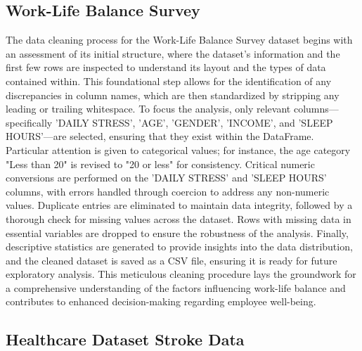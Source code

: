 \documentclass[runningheads]{llncs}
\begin{document}
\begin{enumerate}
\subsection{Work-Life Balance Survey}

The data cleaning process for the Work-Life Balance Survey dataset begins with an assessment of its initial structure, where the dataset's information and the first few rows are inspected to understand its layout and the types of data contained within. This foundational step allows for the identification of any discrepancies in column names, which are then standardized by stripping any leading or trailing whitespace. To focus the analysis, only relevant columns—specifically 'DAILY STRESS', 'AGE', 'GENDER', 'INCOME', and 'SLEEP HOURS'—are selected, ensuring that they exist within the DataFrame. Particular attention is given to categorical values; for instance, the age category "Less than 20" is revised to "20 or less" for consistency. Critical numeric conversions are performed on the 'DAILY STRESS' and 'SLEEP HOURS' columns, with errors handled through coercion to address any non-numeric values. Duplicate entries are eliminated to maintain data integrity, followed by a thorough check for missing values across the dataset. Rows with missing data in essential variables are dropped to ensure the robustness of the analysis. Finally, descriptive statistics are generated to provide insights into the data distribution, and the cleaned dataset is saved as a CSV file, ensuring it is ready for future exploratory analysis. This meticulous cleaning procedure lays the groundwork for a comprehensive understanding of the factors influencing work-life balance and contributes to enhanced decision-making regarding employee well-being.

\subsection{Healthcare Dataset Stroke Data}


\end{enumerate}
\end{document}

